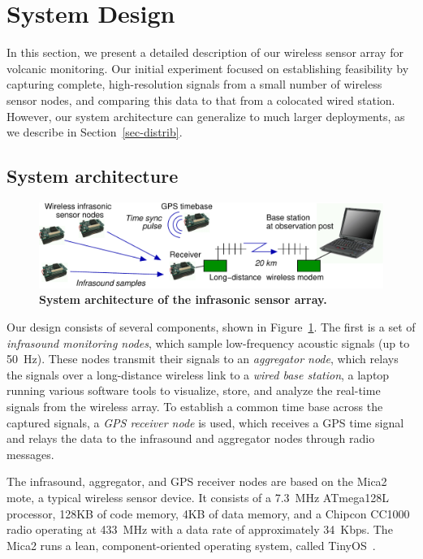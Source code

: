 \section{System Design}
\label{sec-design}

In this section, we present a detailed description of our wireless
sensor array for volcanic monitoring. Our initial experiment focused on
establishing feasibility by capturing complete, 
high-resolution signals from a small number of wireless sensor nodes, 
and comparing this data to that from a colocated wired station. 
However, our system architecture can generalize to much larger
deployments, as we describe in Section~\ref{sec-distrib}.

\subsection{System architecture}

\begin{figure}[t]
\begin{center}
\includegraphics[width=0.9\hsize]{./figures/schematic.pdf}
\end{center}
\caption{\small {\bf System architecture of the infrasonic sensor
array.}}
\label{fig-arch}
\end{figure}

Our design consists of several components, shown
in Figure~\ref{fig-arch}. The first is a set of {\em infrasound
monitoring nodes}, which sample low-frequency acoustic signals (up to
50~Hz). These nodes transmit their signals to an {\em aggregator node},
which relays the signals over a long-distance wireless link to a {\em
wired base station}, a laptop running various
software tools to visualize, store, and analyze the real-time signals
from the wireless array. To establish a common time base across the
captured signals, a {\em GPS receiver node} is used, which receives a
GPS time signal and relays the data to the infrasound and aggregator
nodes through radio messages.  

The infrasound, aggregator, and GPS receiver
nodes are based on the Mica2 mote, a typical wireless sensor device. It
consists of a 7.3~MHz ATmega128L processor, 128KB of code memory, 4KB of
data memory, and a Chipcon CC1000 radio operating at 433~MHz with a data
rate of approximately 34~Kbps. The Mica2 runs a lean, component-oriented
operating system, called TinyOS~\cite{tinyos-asplos00}.

